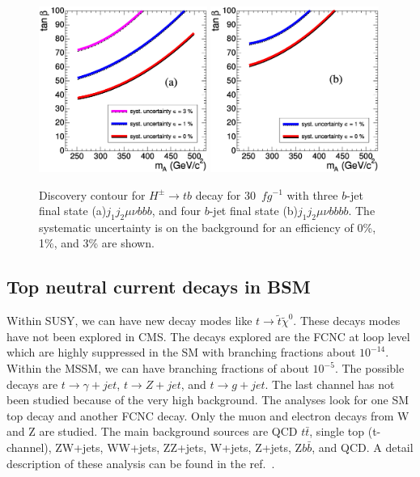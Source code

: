 \documentclass{cimento}
\begin{document}
\begin{figure}
\centering
\includegraphics[width=0.49\textwidth]{fig04a.ps}
\includegraphics[width=0.49\textwidth]{fig04b.ps}
\caption{Discovery contour for $H^{\pm}\rightarrow tb$ decay for 30~$fg^{-1}$
with three $b$-jet final state (a)$j_1j_2\mu\nu bbb$, and four $b$-jet final state
(b)$j_1j_2\mu\nu bbbb$. The systematic uncertainty is on the background for
an efficiency of 0\%, 1\%, and 3\% are shown.}
\label{fig:fig4}
\end{figure}


\subsection{Top neutral current decays in BSM}
\label{sec:FCNC}

Within SUSY, we can have new decay modes like $t\rightarrow\tilde{t}\tilde{\chi}^0$.
These decays modes have not been explored in CMS. The decays explored are
the FCNC at loop level which are highly suppressed in the SM with branching
fractions about $10^{-14}$. Within the MSSM, we can have branching fractions of
about $10^{-5}$. The possible decays are $t\rightarrow \gamma+jet$, 
$t\rightarrow Z+jet$, and $t\rightarrow g+jet$. The last channel has not
been studied because of the very high background. The analyses look for one SM
top decay and another FCNC decay. Only the muon and electron decays from W and Z
are studied. The main background sources are QCD $t\bar{t}$, single top (t-channel),
ZW+jets, WW+jets, ZZ+jets, W+jets, Z+jets, Z$b\bar{b}$, and QCD. A detail description of these analysis
can be found in the ref.~\cite{ref:ptdr2}.
\end{document}

